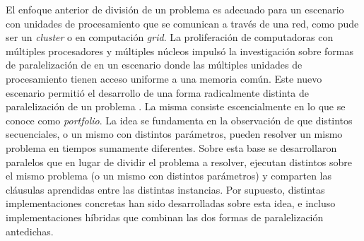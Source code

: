El enfoque anterior de división de un problema \sat es adecuado para un
escenario con unidades de procesamiento que se comunican a través de una red,
como pude ser un \emph{cluster} o en computación \emph{grid}. La proliferación
de computadoras con múltiples procesadores y múltiples núcleos impulsó la
investigación sobre formas de paralelización de \ssolvers en un escenario
donde las múltiples unidades de procesamiento tienen acceso uniforme a una
memoria común. Este nuevo escenario permitió el desarrollo de una forma
radicalmente distinta de paralelización de un problema \sat. La misma consiste
escencialmente en lo que se conoce como \emph{portfolio}. La idea se
fundamenta en la observación de que distintos \ssolvers secuenciales, o un
mismo \ssolver con distintos parámetros, pueden resolver un mismo problema en
tiempos sumamente diferentes. Sobre esta base se desarrollaron \ssolvers
paralelos que en lugar de dividir el problema a resolver, ejecutan distintos
\ssolvers sobre el mismo problema (o un mismo \ssolver con distintos
parámetros) y comparten las cláusulas aprendidas entre las distintas
instancias. Por supuesto, distintas implementaciones concretas han sido
desarrolladas sobre esta idea, e incluso implementaciones híbridas que
combinan las dos formas de paralelización antedichas. 

